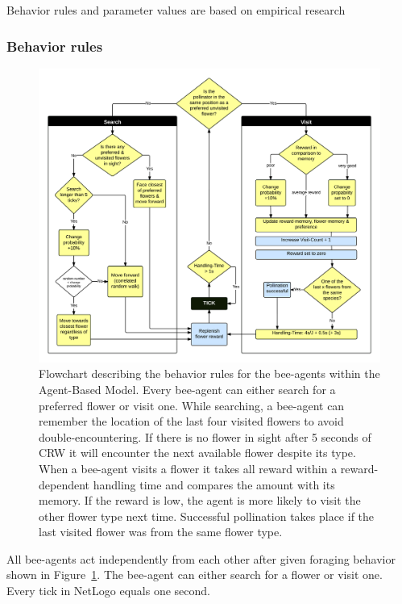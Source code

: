 Behavior rules and parameter values are based on empirical research


\subsubsection{Behavior rules}

\begin{figure}
\centering
\includegraphics[width=15cm]{Images/flowchart-model}
 \caption{Flowchart describing the behavior rules for the bee-agents within the Agent-Based Model. Every bee-agent can either search for a preferred flower or visit one. While searching, a bee-agent can remember the location of the last four visited flowers to avoid double-encountering. If there is no flower in sight after 5 seconds of CRW it will encounter the next available flower despite its type. When a bee-agent visits a flower it takes all reward within a reward-dependent handling time and compares the amount with its memory. If the reward is low, the agent is more likely to visit the other flower type next time. Successful pollination takes place if the last visited flower was from the same flower type.}
 \label{fig:flowchart}
\end{figure}


All bee-agents act independently from each other after given foraging behavior shown in Figure~\ref{fig:flowchart}. The bee-agent can either search for a flower or visit one. Every tick in NetLogo equals one second. \\

